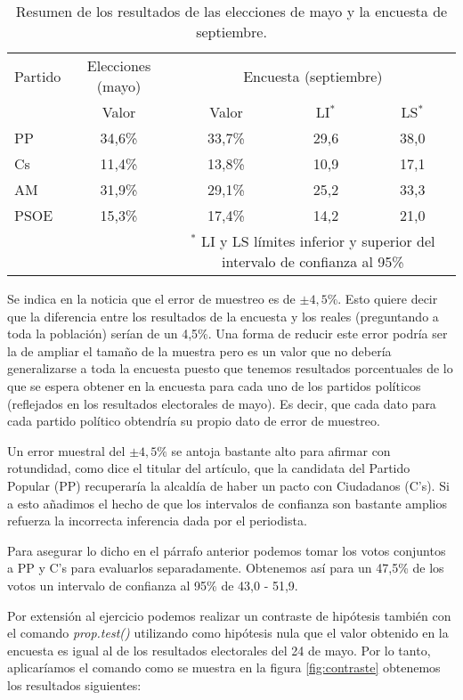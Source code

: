 \documentclass[11pt,a4paper]{article}
\begin{document}
\begin{table}
	\centering
	\begin{tabular}{lcccc}
	\toprule[0.4mm]
	Partido & Elecciones (mayo) & \multicolumn{3}{c}{Encuesta (septiembre)}\\
	& Valor & Valor & LI$^{*}$ & LS$^{*}$ \\
	\midrule
	PP & 34,6\% & 33,7\% & 29,6 & 38,0 \\
	Cs & 11,4\% & 13,8\% & 10,9 & 17,1 \\
	AM & 31,9\% & 29,1\% & 25,2 & 33,3 \\
	PSOE & 15,3\% & 17,4\% & 14,2 & 21,0 \\
	\bottomrule[0.4mm]
	& & \multicolumn{3}{p{3.4cm}}{\footnotesize{$^{*}$ LI y LS límites inferior y superior del intervalo de confianza al 95\%}}
	\end{tabular}
	\caption{Resumen de los resultados de las elecciones de mayo y la encuesta de septiembre.}
\label{tab:resumen}
\end{table}

Se indica en la noticia que el error de muestreo es de $\pm4,5\%$. Esto quiere decir que la diferencia entre los resultados de la encuesta y los reales (preguntando a toda la población) serían de un 4,5\%. Una forma de reducir este error podría ser la de ampliar el tamaño de la muestra pero es un valor que no debería generalizarse a toda la encuesta puesto que tenemos resultados porcentuales de lo que se espera obtener en la encuesta para cada uno de los partidos políticos (reflejados en los resultados electorales de mayo). Es decir, que cada dato para cada partido político obtendría su propio dato de error de muestreo.

Un error muestral del $\pm4,5\%$ se antoja bastante alto para afirmar con rotundidad, como dice el titular del artículo, que la candidata del  Partido Popular (PP) recuperaría la alcaldía de haber un pacto con Ciudadanos (C's). Si a esto añadimos el hecho de que los intervalos de confianza son bastante amplios refuerza la incorrecta inferencia dada por el periodista.

Para asegurar lo dicho en el párrafo anterior podemos tomar los votos conjuntos a PP y C's para evaluarlos separadamente. Obtenemos así para un 47,5\% de los votos un intervalo de confianza al 95\% de 43,0 - 51,9.

Por extensión al ejercicio podemos realizar un contraste de hipótesis también con el comando \textit{prop.test()} utilizando como hipótesis nula que el valor obtenido en la encuesta es igual al de los resultados electorales del 24 de mayo. Por lo tanto, aplicaríamos el comando como se muestra en la figura \ref{fig:contraste} obtenemos los resultados siguientes:
\end{document}
